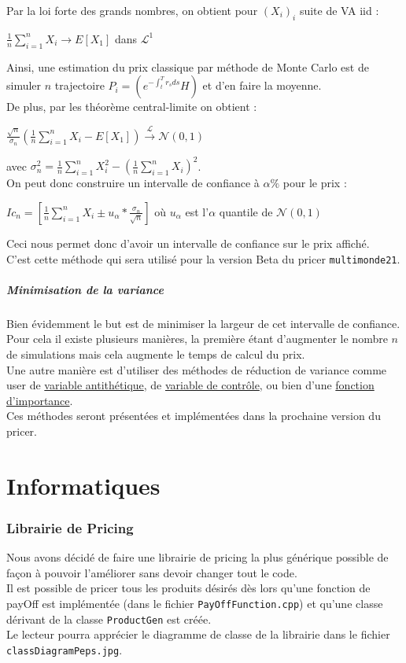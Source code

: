 \documentclass[a4paper,12pt]{article}
\begin{document}
Par la loi forte des grands nombres, on obtient pour $(X_i)_i$ suite de VA iid : 
\begin{center}
$\frac{1}{n}\sum\limits_{i=1}^nX_i \rightarrow E\left[X_1\right]$ dans $\mathcal{L}^1$
\end{center}
Ainsi, une estimation du prix classique par méthode de Monte Carlo est de simuler $n$ trajectoire $P_i = \left(e^{-\int_t^Tr_sds}H\right)$ et d'en faire la moyenne. \\[2mm]
De plus, par les théorème central-limite on obtient : 
\begin{center}
$\frac{\sqrt{n}}{\sigma_n}\left(\frac{1}{n}\sum_{i=1}^nX_i - E\left[X_1\right]\right) \overset{\mathcal{L}}{\rightarrow} \mathcal{N}(0,1)$ 
\end{center}
avec $\sigma_n^2=\frac{1}{n}\sum_{i=1}^nX_i^2-\left(\frac{1}{n}\sum_{i=1}^nX_i\right)^2$. \\

On peut donc construire un intervalle de confiance à $\alpha\%$ pour le prix : 
\begin{center}
$Ic_n=\left[\frac{1}{n}\sum_{i=1}^nX_i \pm u_\alpha * \frac{\sigma_n}{\sqrt{n}} \right]$ où $u_\alpha$ est l'$\alpha$ quantile de $\mathcal{N}(0,1)$
\end{center} 
Ceci nous permet donc d'avoir un intervalle de confiance sur le prix affiché. \\
C'est cette méthode qui sera utilisé pour la version Beta du pricer {\tt multimonde21}.
\subsubsection{Minimisation de la variance}
Bien évidemment le but est de minimiser la largeur de cet intervalle de confiance. Pour cela il existe plusieurs manières, la première étant d'augmenter le nombre $n$ de simulations mais cela augmente le temps de calcul du prix. \\

Une autre manière est d'utiliser des méthodes de réduction de variance comme user de \underline{variable antithétique}, de \underline{variable de contrôle}, ou bien d'une \underline{fonction d'importance}. \\

Ces méthodes seront présentées et implémentées dans la prochaine version du pricer.
\newpage
\part{Informatiques}
\section{Librairie de Pricing}
Nous avons décidé de faire une librairie de pricing la plus générique possible de façon à pouvoir l'améliorer sans devoir changer tout le code. \\
Il est possible de pricer tous les produits désirés dès lors qu'une fonction de payOff est implémentée (dans le fichier {\tt PayOffFunction.cpp}) et qu'une classe dérivant de la classe {\tt ProductGen} est créée. \\
Le lecteur pourra apprécier le diagramme de classe de la librairie dans le fichier {\tt classDiagramPeps.jpg}.
\end{document}
